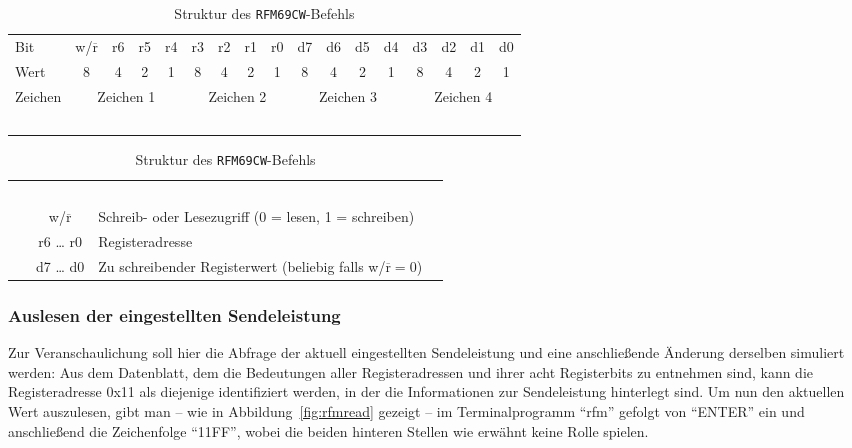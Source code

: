 \documentclass[pdftex, parskip, numbers=noenddot, toc=listof]{scrbook}
\begin{document}
	\begin{table}
		\begin{center}
			\begin{tabularx}{.95\textwidth}{Xc|*{7}c|*{8}c}
				\hline\hline
				Bit  & w/$\overline{\mbox{r}}$ & r6 & r5 & r4                      & r3 & r2 & r1 & r0                      & d7 & d6 & d5 & d4                      & d3 & d2 & d1 & d0                    \\
				Wert & 8                       & 4  & 2  & \multicolumn{1}{c||}{1} & 8  & 4  & 2  & \multicolumn{1}{c||}{1} & 8  & 4  & 2  & \multicolumn{1}{c||}{1} & 8  & 4  & 2  & \multicolumn{1}{c}{1} \\
				Zeichen & \multicolumn{4}{c||}{Zeichen 1} & \multicolumn{4}{c||}{Zeichen 2} & \multicolumn{4}{c||}{Zeichen 3} & \multicolumn{4}{c}{Zeichen 4} \\ ~ \\ \hline
			\end{tabularx}
			\begin{tabularx}{.95\textwidth}{p{2cm}cXp{2cm}}
				~ \\
				  & w/$\overline{\mbox{r}}$ & Schreib- oder Lesezugriff (0 = lesen, 1 = schreiben)                      \\
				  & r6 {\dots} r0           & Registeradresse                                                           \\
				  & d7 {\dots} d0           & Zu schreibender Registerwert (beliebig falls w/$\overline{\mbox{r}} = 0$) \\ \hline\hline
			\end{tabularx}
		\end{center}
		\caption{Struktur des \texttt{RFM69CW}-Befehls}
		\label{tab:rfmcommand}
	\end{table}

	\subsubsection{Auslesen der eingestellten Sendeleistung}
	\label{subsec:readpower}

	Zur Veranschaulichung soll hier die Abfrage der aktuell eingestellten Sendeleistung und eine anschließende Änderung derselben simuliert werden: Aus dem Datenblatt, dem die Bedeutungen aller Registeradressen und ihrer acht Registerbits zu entnehmen sind, kann die Registeradresse 0x11 als diejenige identifiziert werden, in der die Informationen zur Sendeleistung hinterlegt sind. Um nun den aktuellen Wert auszulesen, gibt man -- wie in Abbildung~\ref{fig:rfmread} gezeigt -- im Terminalprogramm \enquote{rfm} gefolgt von \enquote{ENTER} ein und anschließend die Zeichenfolge \enquote{11FF}, wobei die beiden hinteren Stellen wie erwähnt keine Rolle spielen.
\end{document}
